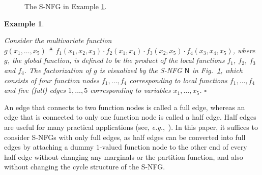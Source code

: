 \documentclass[journal]{IEEEtran}
\newcommand{\add}[1]{{\color{black}#1}}
\newtheorem{example}[theorem]{Example}
\newcommand{\manualendsymbol}[1]{%
  \leavevmode\unskip\penalty9999\hbox{}\nobreak\hfill
  \quad\hbox{#1}}
\newcommand{\eexample}{\manualendsymbol{\ensuremath{\square}}}
\newcommand{\graphN}{ \mathsf{N} }
\newcommand{\defeq}{ \triangleq }
\newcommand*{\eg}{\textit{e.g.}}
\begin{document}
\begin{figure}
  \centering
  \caption{The S-NFG in Example \ref{sec:SNFG:exp:1}.}
  \label{sec:SNFG:fig:1}
\end{figure}

\begin{example}\label{sec:SNFG:exp:1}

  Consider the multivariate function
  $g(x_{1},\ldots,x_{5}) \defeq f_{1}(x_{1},x_{2},x_{3}) \cdot f_{2}(x_{1},x_{4})
    \cdot f_{3}(x_{2},x_{5})\cdot f_{4}(x_{3},x_{4},x_{5})$, where $g$, the
  global function, is defined to be the product of the
  local functions $f_{1}$, $f_{2}$, $f_{3}$ and $f_{4}$. The factorization of $g$ is visualized by the S-NFG $\graphN$ in
  Fig.~\ref{sec:SNFG:fig:1}, which consists of four function nodes
  $f_1, \ldots, f_4$ corresponding to local functions $f_1, \ldots, f_4$
  and five (full) edges $ 1,\ldots,5 $ corresponding to variables
  $x_1, \ldots, x_5$.
  \eexample
\end{example}

An edge that connects to two function nodes is called a full edge, whereas an
edge that is connected to only one function node is called a half
edge. \add{Half edges are useful} for many practical applications (see,
\eg,~\cite{Loeliger2004}). \add{In this paper, it suffices} to consider S-NFGs
with only full edges, as half edges can be converted into full edges by
attaching a dummy $1$-valued function node to the other end of every half edge
without changing any marginals or the partition function, and also without
changing the cycle structure of the S-NFG.
\end{document}
